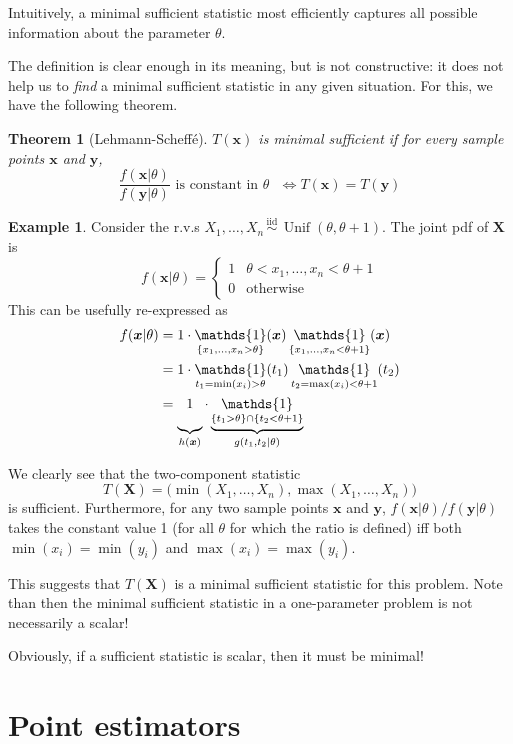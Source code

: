 \documentclass[
]{book}
\newcommand{\bx}{{\boldsymbol x}}
\newcommand{\by}{{\boldsymbol y}}
\newcommand{\bX}{{\boldsymbol X}}
\DeclareMathOperator{\Unif}{Unif}
\DeclareMathOperator{\ind}{\mathds{1}}
\newcommand{\iid}{\,\overset{\text{iid}}{\sim}\,}
\newtheorem{theorem}{Theorem}[chapter]
\theoremstyle{definition}
\theoremstyle{definition}
\newtheorem{example}{Example}[chapter]
\theoremstyle{definition}
\theoremstyle{definition}
\theoremstyle{remark}
\begin{document}
Intuitively, a minimal sufficient statistic most efficiently captures all possible information about the parameter \(\theta\).

The definition is clear enough in its meaning, but is not constructive: it does not help us to \emph{find} a minimal sufficient statistic in any given situation.
For this, we have the following theorem.

\begin{theorem}[Lehmann-Scheffé]
\(T(\bx)\) is minimal sufficient if for every sample points \(\bx\) and \(\by\),
\[
\frac{f(\bx|\theta)}{f(\by|\theta)} \text{ is constant in $\theta$ } \Leftrightarrow T(\bx) = T(\by)
\]
\end{theorem}

\begin{example}
Consider the r.v.s \(X_1,\dots,X_n \iid \Unif(\theta,\theta+1)\). The joint pdf of \(\bX\) is
\[
f(\bx|\theta) =
\begin{cases}
1 & \theta < x_1,\dots,x_n < \theta+1 \\
0 & \text{otherwise}
\end{cases}
\]
This can be usefully re-expressed as
\begin{align*}
f(\bx|\theta) &= 1 \cdot \ind_{\{x_1,\dots,x_n > \theta\}}(\bx)\ind_{\{ x_1,\dots,x_n < \theta+1\}}(\bx) \\
&= 1 \cdot \ind_{t_1=\min(x_i)>\theta}(t_1)\ind_{t_2=\max(x_i)<\theta+1}(t_2) \\
&= \underbrace{1 \vphantom{\ind_{\{t_1>\theta \}}} }_{h(\bx)} \cdot 
\underbrace{\ind_{\{t_1>\theta \} \cap \{t_2<\theta+1 \}}}_{g(t_1,t_2|\theta)}
\end{align*}

We clearly see that the two-component statistic
\[
  T(\bX) = \big(\min(X_1,\dots,X_n), \max(X_1,\dots,X_n) \big)
\]
is sufficient. Furthermore, for any two sample points \(\bx\) and \(\by\), \(f(\bx|\theta)/f(\by|\theta)\) takes the constant value 1 (for all \(\theta\) for which the ratio is defined) iff both \(\min(x_i)=\min(y_i)\) and \(\max(x_i)=\max(y_i)\).

This suggests that \(T(\bX)\) is a minimal sufficient statistic for this problem. Note than then the minimal sufficient statistic in a one-parameter problem is not necessarily a scalar!
\end{example}

Obviously, if a sufficient statistic is scalar, then it must be minimal!

\hypertarget{point-estimators}{%
\section{Point estimators}\label{point-estimators}}
\end{document}

